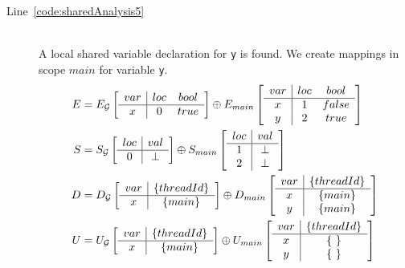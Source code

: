 \begin{description}
	\item[Line~\ref{code:sharedAnalysis5}] \hfill \\
		A local shared variable declaration for \verb$y$ is found. We create mappings in scope
		$main$ for variable \verb$y$.
		\begin{align*}
			E &= E_{\mathcal{G}} \left[
				\begin{array}{c | c c}
					var	& loc	& bool	\\ \hline
					x	& 0		& true
				\end{array}
			\right]
			\oplus
			E_{main} \left[
				\begin{array}{c | c c}
					var	& loc	& bool	\\ \hline
					x	& 1		& false	\\
					y	& 2		& true
				\end{array}
			\right] \\		
			S &= S_{\mathcal{G}} \left[
				\begin{array}{c | c c}
					loc	& val	\\ \hline
					0	& \bot
				\end{array}
			\right]
			\oplus
			S_{main} \left[
				\begin{array}{c | c c}
					loc	& val	\\ \hline
					1	& \bot	\\
					2	& \bot
				\end{array}
			\right] \\
			D &= D_{\mathcal{G}} \left[
				\begin{array}{c | c}
					var	& \lbrace threadId \rbrace	\\ \hline
					x	& \lbrace main \rbrace
				\end{array}
			\right]
			\oplus
			D_{main} \left[
				\begin{array}{c | c c}
					var	& \lbrace threadId \rbrace	\\ \hline
					x	& \lbrace main \rbrace		\\
					y	& \lbrace main \rbrace
				\end{array}
			\right] \\
			U &= U_{\mathcal{G}} \left[
				\begin{array}{c | c}
					var	& \lbrace threadId \rbrace	\\ \hline
					x	& \lbrace main \rbrace
				\end{array}
			\right]	
			\oplus
			U_{main} \left[
				\begin{array}{c | c c}
					var	& \lbrace threadId \rbrace	\\ \hline
					x	& \lbrace ~ \rbrace			\\
					y	& \lbrace ~ \rbrace
				\end{array}
			\right]
		\end{align*}
	

\end{description}
